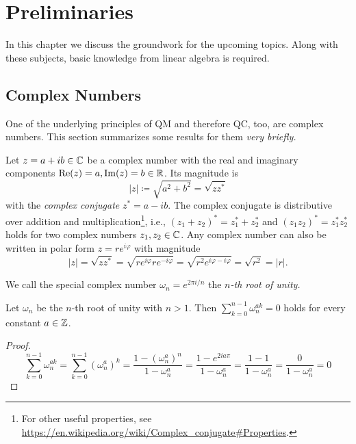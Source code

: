 \chapter{Preliminaries}
	In this chapter we discuss the groundwork for the upcoming topics. Along with these subjects, basic knowledge from linear algebra is required.

	\section{Complex Numbers}
		One of the underlying principles of \ac{QM} and therefore \ac{QC}, too, are complex numbers. This section summarizes some results for them \emph{very briefly.}

		Let \( z = a + ib \in \mathbb{C} \) be a complex number with the real and imaginary components \( \Re(z) = a, \Im(z) = b \in \mathbb{R} \). Its magnitude is
		\begin{equation}
			\lvert z \rvert \coloneqq \sqrt{a^2 + b^2} = \sqrt{z z^\ast}
		\end{equation}
		with the \emph{complex conjugate} \( z^\ast = a - ib \). The complex conjugate is distributive over addition and multiplication\footnote{For other useful properties, see \url{https://en.wikipedia.org/wiki/Complex_conjugate\#Properties}.}, i.e., \( (z_1 + z_2)^\ast = z_1^\ast + z_2^\ast \) and \( (z_1 z_2)^\ast = z_1^\ast z_2^\ast \) holds for two complex numbers \( z_1, z_2 \in \mathbb{C} \). Any complex number can also be written in polar form \( z = r e^{i \varphi} \) with magnitude
		\begin{equation}
			\lvert z \rvert = \sqrt{z z^\ast} = \sqrt{r e^{i \varphi} r e^{-i \varphi}} = \sqrt{r^2 e^{i \varphi - i \varphi}} = \sqrt{r^2} = \lvert r \rvert.
		\end{equation}
		\begin{definition}
			We call the special complex number \( \omega_n = e^{2 \pi i / n} \) the \emph{\(n\)-th root of unity.}
		\end{definition}
		\begin{theorem}  \label{th:rootsOfUnity}
			Let \( \omega_n \) be the \(n\)-th root of unity with \( n > 1 \). Then \( \sum_{k = 0}^{n - 1} \omega_n^{ak} = 0 \) holds for every constant \(a \in \mathbb{Z}\).
		\end{theorem}
		\begin{proof}
			\begin{equation}
				\sum_{k = 0}^{n - 1} \omega_n^{ak}
					= \sum_{k = 0}^{n - 1} (\omega_n^a)^k
					= \frac{1 - (\omega_n^a)^n}{1 - \omega_n^a}
					= \frac{1 - e^{2 i a \pi}}{1 - \omega_n^a}
					= \frac{1 - 1}{1 - \omega_n^a}
					= \frac{0}{1 - \omega_n^a}
					= 0
			\end{equation}
		\end{proof}

